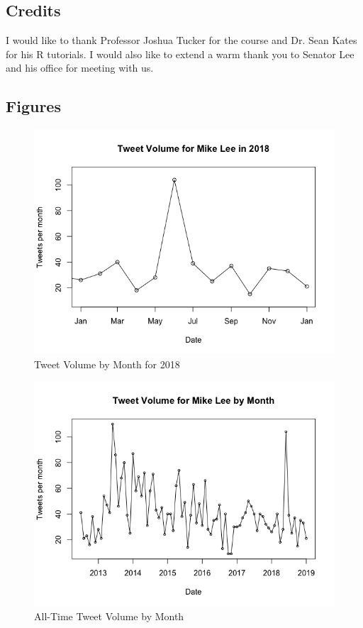 \documentclass{article}
\begin{document}
\subsection{Credits}
\begin{flushleft}
I would like to thank Professor Joshua Tucker for the course and Dr. Sean Kates for his R tutorials. I would also like to extend a warm thank you to Senator Lee and his office for meeting with us. 
\end{flushleft}

\subsection{Figures}
\begin{figure}[h!]
\includegraphics[width =\textwidth]{image/tweet_volume_2018.png}
\caption{Tweet Volume by Month for 2018}
\centering
\end{figure}
\begin{figure}[h!]
\includegraphics[width =\textwidth]{image/tweet_volume_alltime.png}
\caption{All-Time Tweet Volume by Month}
\centering
\end{figure}
\end{document}
